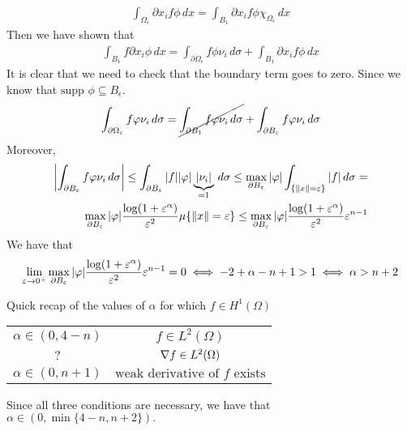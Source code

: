\[
    \begin{split}
        \int_{\Omega_\epsilon} \partial x_i f \phi \, dx = \int_{B_1} \partial x_i f \phi \chi_{\Omega_\epsilon} \, dx
    \end{split}
\]
Then we have shown that 
\[
    \begin{split}
        \int_{B_1} f \partial x_i \phi \, dx = \int_{\partial\Omega_\epsilon} f \phi \nu_i \, d\sigma + \int_{B_1} \partial x_i f \phi \, dx
    \end{split}
\]
It is clear that we need to check that the boundary term goes to zero. Since we know that \(\text{supp } \phi \subseteq B_\epsilon\).
\[
    \begin{split}
        \int_{\partial\Omega_\epsilon} f \phi \nu_i \, d\sigma = \cancel{\int_{\partial B_1} f \phi \nu_i \, d\sigma} + \int_{\partial B_\epsilon} f \phi \nu_i \, d\sigma
    \end{split}
\]
Moreover,
\[
    \begin{split}
        \abs{\int_{\partial B_\epsilon} f \phi \nu_i \, d\sigma} \leq \int_{\partial B_\epsilon} \abs{f} \abs{\phi} \underbrace{\abs{\nu_i}}_{=1} \, d\sigma \leq \max_{\partial B_\epsilon} \abs{\phi} \int_{\{ \norm{x} = \epsilon \}} \abs{f} \, d\sigma = \\
        \max_{\partial B_\epsilon} \abs{\phi} \frac{\log(1+\epsilon^\alpha)}{\epsilon^2} \mu\{\norm{x} = \epsilon\} \leq \max_{\partial B_\epsilon} \abs{\phi} \frac{\log(1+\epsilon^\alpha)}{\epsilon^2} \epsilon^{n-1} 
    \end{split}
\]
We have that 
\[
    \begin{split}
        \lim_{\epsilon \to 0^+} \max_{\partial B_\epsilon} \abs{\phi} \frac{\log(1+\epsilon^\alpha)}{\epsilon^2} \epsilon^{n-1} = 0 \iff -2 + \alpha - n + 1 > 1 \iff \alpha > n + 2
    \end{split}
\]

Quick recap of the values of \(\alpha\) for which \(f \in H^1(\Omega)\) %
\begin{table}[h]
    \centering
        \begin{tabular}{c|c}
            \(\alpha \in (0, {4- n})\) & \(f \in L^2(\Omega)\) \\
            \(?\) & \(\grad f \in L^2(\Omega)\) \\
            \(\alpha \in (0, n + 1)\) & \(\text{weak derivative of } f \text{ exists}\)
        \end{tabular}
\end{table}

Since all three conditions are necessary, we have that \(\alpha \in (0, \min\{4-n, n + 2\}).\)
